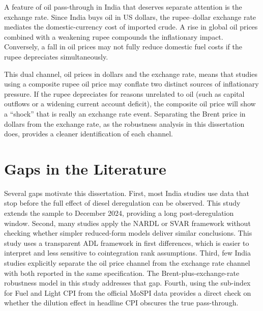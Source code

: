 A feature of oil pass-through in India that deserves separate attention is the exchange rate. Since India buys oil in US dollars, the rupee--dollar exchange rate mediates the domestic-currency cost of imported crude. A rise in global oil prices combined with a weakening rupee compounds the inflationary impact. Conversely, a fall in oil prices may not fully reduce domestic fuel costs if the rupee depreciates simultaneously.

This dual channel, oil prices in dollars and the exchange rate, means that studies using a composite rupee oil price may conflate two distinct sources of inflationary pressure. If the rupee depreciates for reasons unrelated to oil (such as capital outflows or a widening current account deficit), the composite oil price will show a ``shock'' that is really an exchange rate event. Separating the Brent price in dollars from the exchange rate, as the robustness analysis in this dissertation does, provides a cleaner identification of each channel.

\section{Gaps in the Literature}

Several gaps motivate this dissertation. First, most India studies use data that stop before the full effect of diesel deregulation can be observed. This study extends the sample to December 2024, providing a long post-deregulation window. Second, many studies apply the NARDL or SVAR framework without checking whether simpler reduced-form models deliver similar conclusions. This study uses a transparent ADL framework in first differences, which is easier to interpret and less sensitive to cointegration rank assumptions. Third, few India studies explicitly separate the oil price channel from the exchange rate channel with both reported in the same specification. The Brent-plus-exchange-rate robustness model in this study addresses that gap. Fourth, using the sub-index for Fuel and Light CPI from the official MoSPI data provides a direct check on whether the dilution effect in headline CPI obscures the true pass-through.
